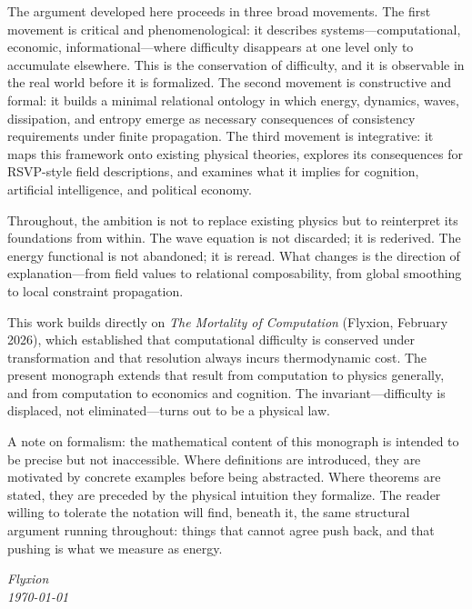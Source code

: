 \documentclass[12pt,a4paper,openany]{book}
\theoremstyle{plain}
\theoremstyle{definition}
\theoremstyle{remark}
\begin{document}
The argument developed here proceeds in three broad movements. The first movement is critical and phenomenological: it describes systems---computational, economic, informational---where difficulty disappears at one level only to accumulate elsewhere. This is the conservation of difficulty, and it is observable in the real world before it is formalized. The second movement is constructive and formal: it builds a minimal relational ontology in which energy, dynamics, waves, dissipation, and entropy emerge as necessary consequences of consistency requirements under finite propagation. The third movement is integrative: it maps this framework onto existing physical theories, explores its consequences for RSVP-style field descriptions, and examines what it implies for cognition, artificial intelligence, and political economy.

Throughout, the ambition is not to replace existing physics but to reinterpret its foundations from within. The wave equation is not discarded; it is rederived. The energy functional is not abandoned; it is reread. What changes is the direction of explanation---from field values to relational composability, from global smoothing to local constraint propagation.

This work builds directly on \textit{The Mortality of Computation} (Flyxion, February 2026), which established that computational difficulty is conserved under transformation and that resolution always incurs thermodynamic cost. The present monograph extends that result from computation to physics generally, and from computation to economics and cognition. The invariant---difficulty is displaced, not eliminated---turns out to be a physical law.

A note on formalism: the mathematical content of this monograph is intended to be precise but not inaccessible. Where definitions are introduced, they are motivated by concrete examples before being abstracted. Where theorems are stated, they are preceded by the physical intuition they formalize. The reader willing to tolerate the notation will find, beneath it, the same structural argument running throughout: things that cannot agree push back, and that pushing is what we measure as energy.

\bigskip
\noindent\textit{Flyxion}\\
\textit{\today}

\clearpage

\tableofcontents
\end{document}
